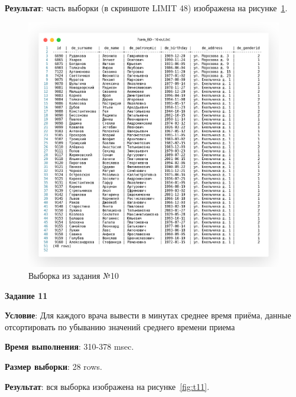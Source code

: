\textbf{Результат}: часть выборки (в скриншоте LIMIT 48) изображена на рисунке~\ref{fig:t10}.

\begin{figure}[!h]
  \centering

  \includegraphics[width=18cm]
  {../sql/task10/10-out.png}

  \caption{Выборка из задания №10}

  \label{fig:t10}
\end{figure}

\newpage


\begin{center}
  \textbf{Задание 11}
\end{center}
  
\textbf{Условие}:
Для каждого врача вывести в минутах среднее время приёма, данные отсортировать по
убыванию значений среднего времени приема




\textbf{Время выполнения}: 310-378 msec.

\textbf{Размер выборки}: 28 rows.

\textbf{Результат}: вся выборка изображена на рисунке~\ref{fig:t11}.

